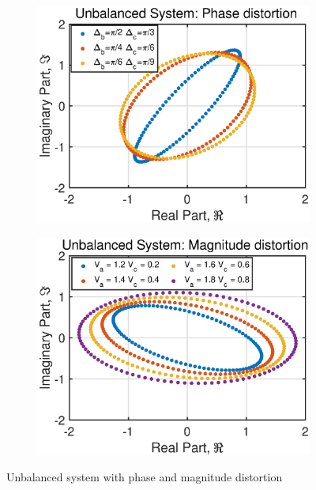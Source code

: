\begin{figure}[htb]
    \centering
    \hspace{-0.4cm}
    \begin{subfigure}[b]{0.3\textwidth}
     \centering
     \includegraphics[width=1.2\textwidth]{fig/31/31c3.eps}
    \end{subfigure}
    \hspace{1.4cm}
    \begin{subfigure}[b]{0.3\textwidth}
     \centering
     \includegraphics[width=1.2\textwidth]{fig/31/31c4.eps}
    \end{subfigure}   
    \caption{Unbalanced system with phase and magnitude distortion}
    \label{fig:3_1_c2}
\end{figure}
